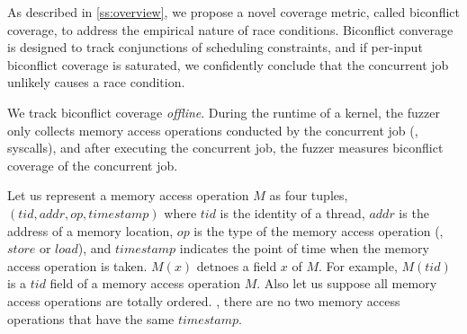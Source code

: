 

As described in \autoref{ss:overview}, we propose a novel coverage
metric, called biconflict coverage, to address the empirical nature of
race conditions.
%
Biconflict converage is designed to track conjunctions of scheduling
constraints, and if per-input biconflict coverage is saturated, we
confidently conclude that the concurrent job unlikely causes a race
condition.

We track biconflict coverage \textit{offline}. During the runtime of a
kernel, the fuzzer only collects memory access operations conducted by
the concurrent job (\eg, syscalls), and after executing the concurrent
job, the fuzzer measures biconflict coverage of the concurrent job.

%
Let us represent a memory access operation $M$ as four tuples,
$(tid, addr, op, timestamp)$ where $tid$ is the identity of a thread,
$addr$ is the address of a memory location, $op$ is the type of the
memory access operation (\ie, $store$ or $load$), and $timestamp$
indicates the point of time when the memory access operation is taken.
%
$M(x)$ detnoes a field $x$ of $M$. For example, $M(tid)$ is a $tid$
field of a memory access operation $M$.
%
Also let us suppose all memory access operations are totally
ordered. \ie, there are no two memory access operations that have the
same $timestamp$.

